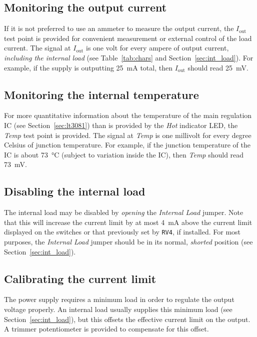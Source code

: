 \documentclass[letterpaper,twocolumn,11pt]{article}
\newcommand{\refdes}[1]{\texttt{#1}}
\begin{document}
\subsection{Monitoring the output current}

If it is not preferred to use an ammeter to measure the output current, the
\textit{$I_\text{out}$} test point is provided for convenient measurement or
external control of the load current. The signal at \textit{$I_\text{out}$}
is one volt for every ampere of output current, \emph{including the internal
load} (see Table~\ref{tab:chars} and Section~\ref{sec:int_load}). For example,
if the supply is outputting \SI{25}{\mA} total, then \textit{$I_\text{out}$}
should read \SI{25}{\mV}.

\subsection{Monitoring the internal temperature}

For more quantitative information about the temperature of the main regulation
IC (see Section~\ref{sec:lt3081}) than is provided by the \textit{Hot} indicator
LED, the \textit{Temp} test point is provided. The signal at \textit{Temp} is
one millivolt for every degree Celsius of junction temperature. For example, if
the junction temperature of the IC is about \SI{73}{\celsius} (subject to
variation inside the IC), then \textit{Temp} should read \SI{73}{\mV}.

\subsection{Disabling the internal load}

The internal load may be disabled by \emph{opening} the \textit{Internal Load}
jumper.  Note that this will increase the current limit by at most \SI{4}{\mA}
above the current limit displayed on the switches or that previously set by
\refdes{RV4}, if installed. For most purposes, the \textit{Internal Load} jumper
should be in its normal, \emph{shorted} position (see
Section~\ref{sec:int_load}).

\subsection{Calibrating the current limit}

The power supply requires a minimum load in order to regulate the output voltage
properly. An internal load usually supplies this minimum load (see
Section~\ref{sec:int_load}), but this offsets the effective current limit on the
output. A trimmer potentiometer is provided to compensate for this offset.
\end{document}
